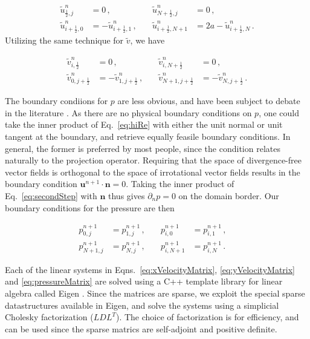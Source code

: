 \documentclass[final,3p,twocolumn]{elsarticle}
\begin{document}
\begin{align}
    \nonumber 
    \tilde{u}_{\frac{1}{2},j}^n &= 0 \,, &\quad \tilde{u}_{N + \frac{1}{2},j}^n
    &= 0 \,, \\
    \label{eq:xVelocityBCs}
    \tilde{u}_{i+\frac{1}{2},0}^n &= - \tilde{u}_{i+\frac{1}{2},1}^n \,, &\quad
    \tilde{u}_{i+\frac{1}{2},N+1}^n &= 2a - \tilde{u}_{i+\frac{1}{2},N}^n \,.
\end{align}
%
Utilizing the same technique for $\tilde{v}$, we have 

\begin{align}
    \nonumber
    \tilde{v}_{i,\frac{1}{2}}^n &= 0 \,, &\quad 
    \tilde{v}_{i, N + \frac{1}{2}}^n &= 0 \,, \\
    \label{eq:yVelocityBCs}
    \tilde{v}_{0, j+\frac{1}{2}}^n &= - \tilde{v}_{1, j+\frac{1}{2}}^n \,,
    &\quad \tilde{v}_{N+1, j+\frac{1}{2}}^n &= - \tilde{v}_{N, j+\frac{1}{2}}^n
    \,.
\end{align}

The boundary condiions for $p$ are less obvious, and have been subject to
debate in the literature \cite{liu1995projection}. As there are no physical
boundary conditions on $p$, one could take the inner product of Eq.\
\eqref{eq:hiRe} with either the unit normal or unit tangent at the boundary,
and retrieve equally feasile boundary conditions. In general, the former is
preferred by most people, since the condition relates naturally to the
projection operator. Requiring that the space of divergence-free vector fields
is orthogonal to the space of irrotational vector fields results in the boundary
condition $\bm{u}^{n+1} \cdot \bm{n} = 0$. Taking the inner product of Eq.\
\eqref{eq:secondStep} with $\bm{n}$ thus gives $\partial_n p = 0$ on the
domain border. Our boundary conditions for the pressure are then

\begin{align}
    \nonumber
    p_{0,j}^{n+1} &= p_{1,j}^{n+1} \,, &\quad p_{i,0}^{n+1} &= p_{i,1}^{n+1}
    \,, \quad \\
    \label{eq:pressureBCs}
    p_{N+1,j}^{n+1} &= p_{N,j}^{n+1} \,, &\quad p_{i,N+1}^{n+1} &=
    p_{i,N}^{n+1} \,.
\end{align}

Each of the linear systems in Eqns.\ \eqref{eq:xVelocityMatrix},
\eqref{eq:yVelocityMatrix} and \eqref{eq:pressureMatrix} are solved using a C++
template library for linear algebra called Eigen \cite{eigenweb}. Since the
matrices are sparse, we exploit the special sparse datastructures available in
Eigen, and solve the systems using a simplicial Cholesky factorization
($LDL^T$). The choice of factorization is for efficiency, and can be used since
the sparse matrics are self-adjoint and positive definite. 
\end{document}
